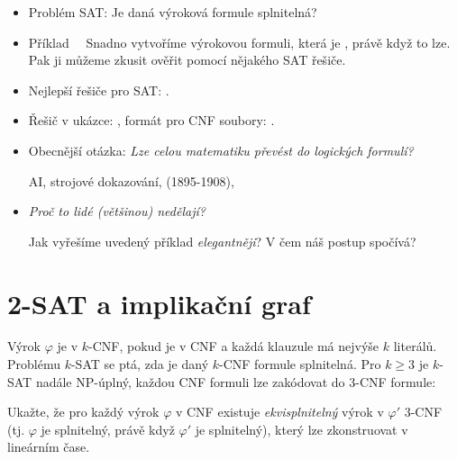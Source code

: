 \begin{itemize}
    \item Problém {SAT}: Je daná výroková formule splnitelná?
    
    \item {Příklad}\ \ 
    Snadno vytvoříme výrokovou formuli, která je , právě když
    to lze. Pak ji můžeme zkusit ověřit pomocí nějakého SAT řešiče.

    \item Nejlepší řešiče pro SAT: \href{http://www.satcompetition.org}{}.
    
    \item Řešič v ukázce: \href{http://www.labri.fr/perso/lsimon/glucose/}{}, formát pro CNF soubory: \href{http://people.sc.fsu.edu/~jburkardt/data/cnf/cnf.html}{}.
    
    \item Obecnější otázka: \emph{Lze celou matematiku převést do logických formulí?}
    
    AI, strojové dokazování,  (1895-1908), 
    
    \item \emph{Proč to lidé (většinou) nedělají?}
    
    Jak vyřešíme uvedený příklad \emph{elegantněji}? V čem náš postup spočívá?
\end{itemize}





\section{2-SAT a implikační graf}

Výrok $\varphi$ je v $k$-CNF, pokud je v CNF a každá klauzule má nejvýše $k$ literálů. Problému $k$-SAT se ptá, zda je daný $k$-CNF formule splnitelná. Pro $k\geq 3$ je $k$-SAT nadále NP-úplný, každou CNF formuli lze zakódovat do 3-CNF formule:

\begin{exercise}
Ukažte, že pro každý výrok $\varphi$ v CNF existuje \emph{ekvisplnitelný} výrok v $\varphi'$ 3-CNF (tj. $\varphi$ je splnitelný, právě když $\varphi'$ je splnitelný), který lze zkonstruovat v lineárním čase.
\end{exercise}

